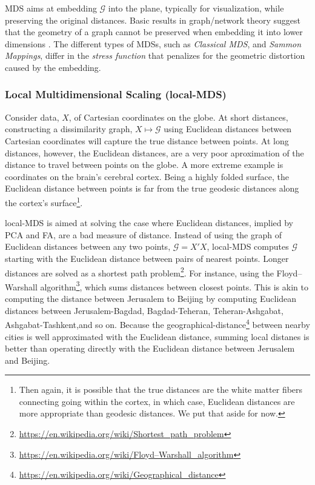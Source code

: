 \documentclass[]{book}
\renewcommand{\href}[2]{#2\footnote{\url{#1}}}
\theoremstyle{definition}
\theoremstyle{definition}
\theoremstyle{definition}
\theoremstyle{remark}
\let\BeginKnitrBlock\begin \let\EndKnitrBlock\end
\begin{document}
MDS aims at embedding \(\mathcal{G}\) into the plane, typically for visualization, while preserving the original distances.
Basic results in graph/network theory suggest that the geometry of a graph cannot be preserved when embedding it into lower dimensions \citep{graham1988isometric}.
The different types of MDSs, such as \emph{Classical MDS}, and \emph{Sammon Mappings}, differ in the \emph{stress function} that penalizes for the geometric distortion caused by the embedding.

\hypertarget{loc-mds}{%
\subsubsection{Local Multidimensional Scaling (local-MDS)}\label{loc-mds}}

\BeginKnitrBlock{example}
\protect\hypertarget{exm:non-euclidean}{}{\label{exm:non-euclidean} }Consider data, \(X\), of Cartesian coordinates on the globe.
At short distances, constructing a dissimilarity graph, \(X \mapsto \mathcal{G}\) using Euclidean distances between Cartesian coordinates will capture the true distance between points.
At long distances, however, the Euclidean distances, are a very poor aproximation of the distance to travel between points on the globe.
A more extreme example is coordinates on the brain's cerebral cortex.
Being a highly folded surface, the Euclidean distance between points is far from the true geodesic distances along the cortex's surface\footnote{Then again, it is possible that the true distances are the white matter fibers connecting going within the cortex, in which case, Euclidean distances are more appropriate than geodesic distances. We put that aside for now.}.
\EndKnitrBlock{example}

local-MDS is aimed at solving the case where Euclidean distances, implied by PCA and FA, are a bad measure of distance.
Instead of using the graph of Euclidean distances between any two points, \(\mathcal{G}=X'X\), local-MDS computes \(\mathcal{G}\) starting with the Euclidean distance between pairs of nearest points.
Longer distances are solved as a \href{https://en.wikipedia.org/wiki/Shortest_path_problem}{shortest path problem}.
For instance, using the \href{https://en.wikipedia.org/wiki/Floyd–Warshall_algorithm}{Floyd--Warshall algorithm}, which sums distances between closest points.
This is akin to computing the distance between Jerusalem to Beijing by computing Euclidean distances between Jerusalem-Bagdad, Bagdad-Teheran, Teheran-Ashgabat, Ashgabat-Tashkent,and so on. Because the \href{https://en.wikipedia.org/wiki/Geographical_distance}{geographical-distance} between nearby cities is well approximated with the Euclidean distance, summing local distanes is better than operating directly with the Euclidean distance between Jerusalem and Beijing.
\end{document}

